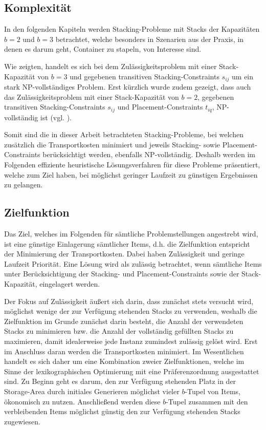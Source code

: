 \subsection{Komplexität}
\label{sec:complexity}

In den folgenden Kapiteln werden Stacking-Probleme mit Stacks der Kapazitäten $b = 2$
und $b = 3 $ betrachtet, welche besonders in Szenarien aus der Praxis, in denen es darum geht,
Container zu stapeln, von Interesse sind.

Wie \citet{Bruns2015} zeigten, handelt es sich bei dem Zulässigkeitsproblem mit einer Stack-Kapazität von $b=3$ und gegebenen transitiven Stacking-Constraints $s_{ij}$ um ein stark NP-vollständiges Problem. Erst kürzlich wurde zudem gezeigt, dass auch das Zulässigkeitsproblem mit einer Stack-Kapazität von $b=2$, gegebenen transitiven
Stacking-Constraints $s_{ij}$ und Placement-Constraints $t_{iq}$, NP-vollständig ist (vgl. \citet{Chernykh2019}).

Somit sind die in dieser Arbeit betrachteten Stacking-Probleme, bei welchen zusätzlich die Transportkosten minimiert
und jeweils Stacking- sowie Placement-Constraints berücksichtigt werden, ebenfalls NP-vollständig.
Deshalb werden im Folgenden effiziente heuristische Lösungsverfahren für diese Probleme präsentiert,
welche zum Ziel haben, bei möglichst geringer Laufzeit zu günstigen Ergebnissen zu gelangen.

\subsection{Zielfunktion}
\label{sec:objective}

Das Ziel, welches im Folgenden für sämtliche Problemstellungen angestrebt wird, ist eine günstige
Einlagerung sämtlicher Items, d.h. die Zielfunktion entspricht der Minimierung der Transportkosten.
Dabei haben Zulässigkeit und geringe Laufzeit Priorität. Eine Lösung wird als zulässig betrachtet,
wenn sämtliche Items unter Berücksichtigung der Stacking- und Placement-Constraints sowie der Stack-Kapazität,
eingelagert werden.

Der Fokus auf Zulässigkeit äußert sich darin, dass zunächst stets versucht wird, möglichst wenige der zur Verfügung stehenden Stacks zu verwenden, weshalb die Zielfunktion im Grunde zunächst darin besteht, die Anzahl der verwendeten Stacks zu minimieren bzw. die Anzahl der vollständig gefüllten Stacks zu maximieren, damit idealerweise jede Instanz zumindest zulässig gelöst wird.
Erst im Anschluss daran werden die Transportkosten minimiert.
Im Wesentlichen handelt es sich daher um eine Kombination zweier Zielfunktionen,
welche im Sinne der lexikographischen Optimierung mit eine Präferenzordnung ausgestattet sind.
Zu Beginn geht es darum, den zur Verfügung stehenden Platz in der Storage-Area durch initiales Generieren
möglichst vieler $b$-Tupel von Items, ökonomisch zu nutzen. Anschließend werden diese $b$-Tupel
zusammen mit den verbleibenden Items möglichst günstig den zur Verfügung stehenden Stacks zugewiesen.

